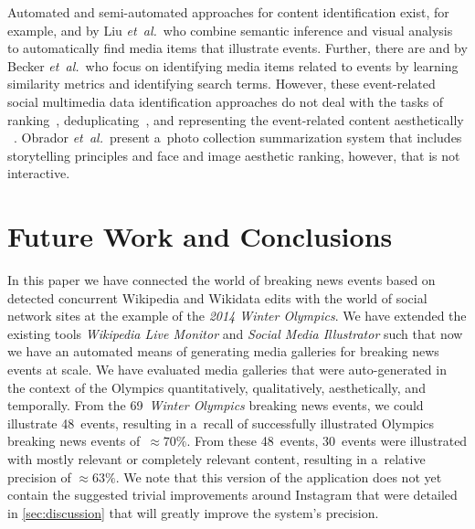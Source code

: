 \documentclass{sig-alternate}
\begin{document}
Automated and semi-automated approaches for content identification exist,
for example, \cite{liu2011events} and \cite{liu2011socialmedia}
by Liu \emph{et~al.}\ who combine semantic inference
and visual analysis to automatically find media items
that illustrate events.
Further, there are \cite{becker2010eventidentification}
and \cite{becker2012plannedevents} by Becker \emph{et~al.}\
who focus on identifying media items related to events
by learning similarity metrics and identifying search terms.
However, these event-related social multimedia data
identification approaches do not deal with the tasks of
ranking~\cite{liu2009learningtorank}, deduplicating~\cite{yang2009nearduplicate},
and representing the event-related content aesthetically%
~\cite{sandhaus2011photobook,obrador2012photoaesthetics}.
Obrador \emph{et~al.}\ present a~photo collection summarization system
that includes storytelling principles and face and image aesthetic ranking,
however, that is not interactive.

\section{Future Work and Conclusions}
\label{sec:future-work-and-conclusions}
\selectfont

In this paper we have connected the world of breaking news events
based on detected concurrent Wikipedia and Wikidata edits
with the world of social network sites
at the example of the \emph{2014 Winter Olympics}.
We have extended the existing tools \emph{Wikipedia Live Monitor}
and \emph{Social Media Illustrator} such that now we have 
an automated means of generating media galleries
for breaking news events at scale.
We have evaluated media galleries that were auto-generated 
in the context of the Olympics quantitatively,
qualitatively, aesthetically, and temporally.
From the 69~\emph{Winter Olympics} breaking news events,
we could illustrate 48~events, resulting in a~recall of successfully illustrated Olympics breaking news events of~${\approx}70\%$. 
From these 48~events, 30~events were illustrated
with mostly relevant or completely relevant content,
resulting in a~relative precision of ${\approx}63\%$.
We note that this version of the application
does not yet contain the suggested trivial improvements around Instagram
that were detailed in \autoref{sec:discussion}
that will greatly improve the system's precision.
\end{document}
